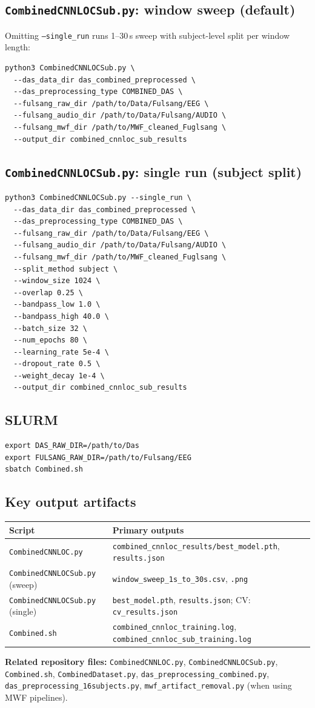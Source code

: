 \documentclass[11pt,a4paper]{article}
\newcommand{\py}[1]{\texttt{#1}}
\begin{document}
\subsection{\py{CombinedCNNLOCSub.py}: window sweep (default)}

Omitting \texttt{--single\_run} runs 1--30\,s sweep with subject-level split per window length:

\begin{verbatim}
python3 CombinedCNNLOCSub.py \
  --das_data_dir das_combined_preprocessed \
  --das_preprocessing_type COMBINED_DAS \
  --fulsang_raw_dir /path/to/Data/Fulsang/EEG \
  --fulsang_audio_dir /path/to/Data/Fulsang/AUDIO \
  --fulsang_mwf_dir /path/to/MWF_cleaned_Fuglsang \
  --output_dir combined_cnnloc_sub_results
\end{verbatim}

\subsection{\py{CombinedCNNLOCSub.py}: single run (subject split)}

\begin{verbatim}
python3 CombinedCNNLOCSub.py --single_run \
  --das_data_dir das_combined_preprocessed \
  --das_preprocessing_type COMBINED_DAS \
  --fulsang_raw_dir /path/to/Data/Fulsang/EEG \
  --fulsang_audio_dir /path/to/Data/Fulsang/AUDIO \
  --fulsang_mwf_dir /path/to/MWF_cleaned_Fuglsang \
  --split_method subject \
  --window_size 1024 \
  --overlap 0.25 \
  --bandpass_low 1.0 \
  --bandpass_high 40.0 \
  --batch_size 32 \
  --num_epochs 80 \
  --learning_rate 5e-4 \
  --dropout_rate 0.5 \
  --weight_decay 1e-4 \
  --output_dir combined_cnnloc_sub_results
\end{verbatim}

\subsection{SLURM}

\begin{verbatim}
export DAS_RAW_DIR=/path/to/Das
export FULSANG_RAW_DIR=/path/to/Fulsang/EEG
sbatch Combined.sh
\end{verbatim}

\subsection{Key output artifacts}

\begin{tabular}{@{}ll@{}}
\toprule
Script & Primary outputs \\
\midrule
\py{CombinedCNNLOC.py} & \py{combined\_cnnloc\_results/best\_model.pth}, \py{results.json} \\
\py{CombinedCNNLOCSub.py} (sweep) & \py{window\_sweep\_1s\_to\_30s.csv}, \py{.png} \\
\py{CombinedCNNLOCSub.py} (single) & \py{best\_model.pth}, \py{results.json}; CV: \py{cv\_results.json} \\
\py{Combined.sh} & \py{combined\_cnnloc\_training.log}, \py{combined\_cnnloc\_sub\_training.log} \\
\bottomrule
\end{tabular}

\vspace{1em}
\noindent\textbf{Related repository files:} \py{CombinedCNNLOC.py}, \py{CombinedCNNLOCSub.py}, \py{Combined.sh}, \py{CombinedDataset.py}, \py{das\_preprocessing\_combined.py}, \py{das\_preprocessing\_16subjects.py}, \py{mwf\_artifact\_removal.py} (when using MWF pipelines).
\end{document}
